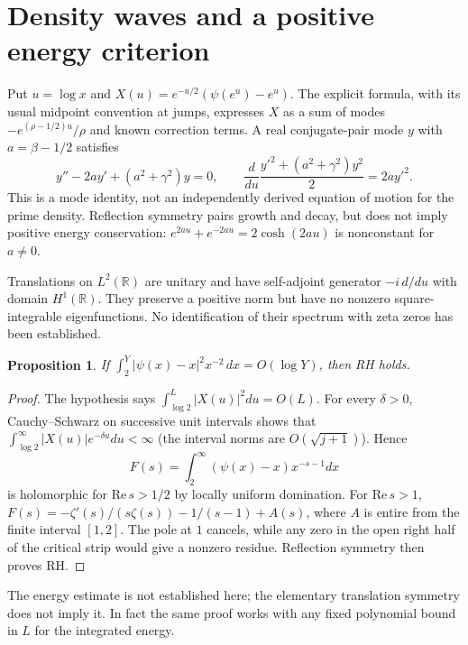 \documentclass[11pt,a4paper]{article}
\newtheorem{proposition}{Proposition}[section]
\theoremstyle{definition}\newtheorem{definition}[proposition]{Definition}
\theoremstyle{remark}\newtheorem{remark}[proposition]{Remark}
\begin{document}
\section{Density waves and a positive energy criterion}
Put $u=\log x$ and $X(u)=e^{-u/2}(\psi(e^u)-e^u)$.
The explicit formula, with its usual midpoint convention at jumps, expresses $X$ as a sum of modes $-e^{(\rho-1/2)u}/\rho$ and known correction terms. A real conjugate-pair mode $y$ with $a=\beta-1/2$ satisfies
\[
y''-2ay'+(a^2+\gamma^2)y=0,\qquad
\frac{d}{du}\frac{y'^2+(a^2+\gamma^2)y^2}{2}=2ay'^2.
\]
This is a mode identity, not an independently derived equation of motion for the prime density. Reflection symmetry pairs growth and decay, but does not imply positive energy conservation: $e^{2au}+e^{-2au}=2\cosh(2au)$ is nonconstant for $a\ne0$.

Translations on $L^2(\mathbb R)$ are unitary and have self-adjoint generator $-i\,d/du$ with domain $H^1(\mathbb R)$. They preserve a positive norm but have no nonzero square-integrable eigenfunctions. No identification of their spectrum with zeta zeros has been established.

\begin{proposition}
If $\int_2^Y|\psi(x)-x|^2x^{-2}\,dx=O(\log Y)$, then RH holds.
\end{proposition}
\begin{proof}
The hypothesis says $\int_{\log2}^L|X(u)|^2du=O(L)$. For every $\delta>0$, Cauchy--Schwarz on successive unit intervals shows that $\int_{\log2}^\infty |X(u)|e^{-\delta u}du<\infty$ (the interval norms are $O(\sqrt{j+1})$). Hence
\[
F(s)=\int_2^\infty(\psi(x)-x)x^{-s-1}dx
\]
is holomorphic for $\mathrm{Re}\,s>1/2$ by locally uniform domination. For $\mathrm{Re}\,s>1$,
$F(s)=-\zeta'(s)/(s\zeta(s))-1/(s-1)+A(s)$,
where $A$ is entire from the finite interval $[1,2]$. The pole at $1$ cancels, while any zero in the open right half of the critical strip would give a nonzero residue. Reflection symmetry then proves RH.
\end{proof}
The energy estimate is not established here; the elementary translation symmetry does not imply it. In fact the same proof works with any fixed polynomial bound in $L$ for the integrated energy.
\end{document}
